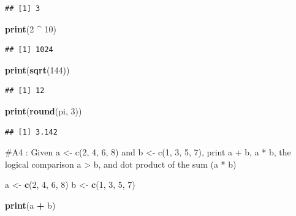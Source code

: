 \documentclass[
]{article}
\newenvironment{Shaded}{\begin{snugshade}}{\end{snugshade}}
\newcommand{\DecValTok}[1]{\textcolor[rgb]{0.00,0.00,0.81}{#1}}
\newcommand{\FunctionTok}[1]{\textcolor[rgb]{0.13,0.29,0.53}{\textbf{#1}}}
\newcommand{\NormalTok}[1]{#1}
\newcommand{\OtherTok}[1]{\textcolor[rgb]{0.56,0.35,0.01}{#1}}
\newcommand{\SpecialCharTok}[1]{\textcolor[rgb]{0.81,0.36,0.00}{\textbf{#1}}}
\begin{document}
\begin{verbatim}
## [1] 3
\end{verbatim}

\begin{Shaded}
\begin{Highlighting}[]
\FunctionTok{print}\NormalTok{(}\DecValTok{2} \SpecialCharTok{\^{}} \DecValTok{10}\NormalTok{)}
\end{Highlighting}
\end{Shaded}

\begin{verbatim}
## [1] 1024
\end{verbatim}

\begin{Shaded}
\begin{Highlighting}[]
\FunctionTok{print}\NormalTok{(}\FunctionTok{sqrt}\NormalTok{(}\DecValTok{144}\NormalTok{))}
\end{Highlighting}
\end{Shaded}

\begin{verbatim}
## [1] 12
\end{verbatim}

\begin{Shaded}
\begin{Highlighting}[]
\FunctionTok{print}\NormalTok{(}\FunctionTok{round}\NormalTok{(pi, }\DecValTok{3}\NormalTok{))}
\end{Highlighting}
\end{Shaded}

\begin{verbatim}
## [1] 3.142
\end{verbatim}

\#A4 : Given a \textless- c(2, 4, 6, 8) and b \textless- c(1, 3, 5, 7),
print a + b, a * b, the logical comparison a \textgreater{} b, and dot
product of the sum (a * b)

\begin{Shaded}
\begin{Highlighting}[]
\NormalTok{a }\OtherTok{\textless{}{-}} \FunctionTok{c}\NormalTok{(}\DecValTok{2}\NormalTok{, }\DecValTok{4}\NormalTok{, }\DecValTok{6}\NormalTok{, }\DecValTok{8}\NormalTok{)}
\NormalTok{b }\OtherTok{\textless{}{-}} \FunctionTok{c}\NormalTok{(}\DecValTok{1}\NormalTok{, }\DecValTok{3}\NormalTok{, }\DecValTok{5}\NormalTok{, }\DecValTok{7}\NormalTok{)}

\FunctionTok{print}\NormalTok{(a }\SpecialCharTok{+}\NormalTok{ b)}
\end{Highlighting}
\end{Shaded}
\end{document}
